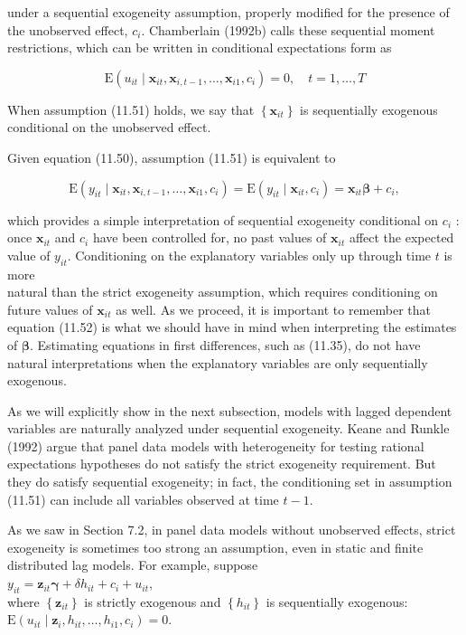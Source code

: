 \documentclass[10pt]{article}
\begin{document}
under a sequential exogeneity assumption, properly modified for the presence of the unobserved effect, $c_{i}$. Chamberlain (1992b) calls these sequential moment restrictions, which can be written in conditional expectations form as


\begin{equation*}
\mathrm{E}\left(u_{i t} \mid \mathbf{x}_{i t}, \mathbf{x}_{i, t-1}, \ldots, \mathbf{x}_{i 1}, c_{i}\right)=0, \quad t=1, \ldots, T \tag{11.51}
\end{equation*}


When assumption (11.51) holds, we say that $\left\{\mathbf{x}_{i t}\right\}$ is sequentially exogenous conditional on the unobserved effect.

Given equation (11.50), assumption (11.51) is equivalent to


\begin{equation*}
\mathrm{E}\left(y_{i t} \mid \mathbf{x}_{i t}, \mathbf{x}_{i, t-1}, \ldots, \mathbf{x}_{i 1}, c_{i}\right)=\mathrm{E}\left(y_{i t} \mid \mathbf{x}_{i t}, c_{i}\right)=\mathbf{x}_{i t} \boldsymbol{\beta}+c_{i}, \tag{11.52}
\end{equation*}


which provides a simple interpretation of sequential exogeneity conditional on $c_{i}$ : once $\mathbf{x}_{i t}$ and $c_{i}$ have been controlled for, no past values of $\mathbf{x}_{i t}$ affect the expected value of $y_{i t}$. Conditioning on the explanatory variables only up through time $t$ is more\\
natural than the strict exogeneity assumption, which requires conditioning on future values of $\mathbf{x}_{i t}$ as well. As we proceed, it is important to remember that equation (11.52) is what we should have in mind when interpreting the estimates of $\boldsymbol{\beta}$. Estimating equations in first differences, such as (11.35), do not have natural interpretations when the explanatory variables are only sequentially exogenous.

As we will explicitly show in the next subsection, models with lagged dependent variables are naturally analyzed under sequential exogeneity. Keane and Runkle (1992) argue that panel data models with heterogeneity for testing rational expectations hypotheses do not satisfy the strict exogeneity requirement. But they do satisfy sequential exogeneity; in fact, the conditioning set in assumption (11.51) can include all variables observed at time $t-1$.

As we saw in Section 7.2, in panel data models without unobserved effects, strict exogeneity is sometimes too strong an assumption, even in static and finite distributed lag models. For example, suppose\\
$y_{i t}=\mathbf{z}_{i t} \boldsymbol{\gamma}+\delta h_{i t}+c_{i}+u_{i t}$,\\
where $\left\{\mathbf{z}_{i t}\right\}$ is strictly exogenous and $\left\{h_{i t}\right\}$ is sequentially exogenous:\\
$\mathrm{E}\left(u_{i t} \mid \mathbf{z}_{i}, h_{i t}, \ldots, h_{i 1}, c_{i}\right)=0$.
\end{document}
